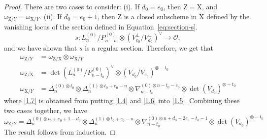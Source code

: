 \documentclass[a4paper]{amsart}
\theoremstyle{plain}
\theoremstyle{definition}
\numberwithin{equation}{section}
\newcommand{\SO}{\mathcal{O}}
\begin{document}
\begin{proof}
    There are two cases to consider: (i). If $d_0 = e_0$, then $\mathrm{Z} = \mathrm{X}$, and $\omega_{\mathrm{Z}/Y} = \omega_{\mathrm{X}/Y}$. (ii). If $d_0 = e_0 + 1$, then $\mathrm{Z}$ is a closed subscheme in $\mathrm{X}$ defined by the vanishing locus of the section defined in Equation~\eqref{eq:section-s}.
    \[ s: L_n^{(0)}/P_{n-t_0}^{(0)} \otimes (V_{e_0}^\perp/V_{d_0}^\perp)^\vee \to \SO, \]
    and we have shown that $s$ is a regular section. Therefore, we get that
    \begin{align}
        \label{1.5} 	\omega_{\mathrm{Z} /Y}           & = \omega_{\mathrm{Z} /\mathrm{X} } \otimes \omega_{\mathrm{X} /Y}                                                                                              \\
        \label{1.6} 	\omega_{\mathrm{Z} /\mathrm{X} } & = \det(L_n^{(0)}/P_{n-t_0}^{(0)})^{\vee} \otimes (V_{d_0} / V_{e_0})^{\otimes -t_0}                                                                            \\
        \label{1.7} \omega_{\mathrm{X} /Y}            & = \Delta_n^{(0)\otimes t_0} \otimes \Delta_n^{(1)\otimes t_0 + e_0 - n} \otimes \nabla_{n-t_0}^{(0)\otimes n - t_0 - e_0} \otimes \det(V_{d_0})^{\otimes -t_0}
    \end{align}
    where \eqref{1.7} is obtained from putting \eqref{1.4} and \eqref{1.6} into \eqref{1.5}.
    Combining these two cases together, we have
    \[
        \omega_{\mathrm{Z} /Y} = \Delta_n^{(0)\otimes t_0 + e_0 + 1 - d_0} \otimes \Delta_n^{(1)\otimes t_0 + e_0 - n} \otimes \nabla_{n-t_0}^{(0)\otimes n + d_0 - 2e_0 - t_0 - 1} \otimes \det(V_{d_0})^{\otimes -t_0}
    \]
    The result follows from induction.
\end{proof}
\end{document}
